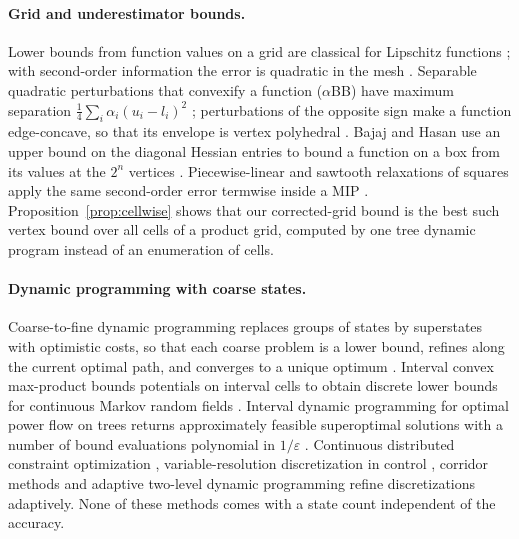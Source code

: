 \paragraph{Grid and underestimator bounds.}
Lower bounds from function values on a grid are classical for Lipschitz
functions \cite{Piyavskii1972,Shubert1972,Nesterov2004}; with second-order
information the error is quadratic in the mesh
\cite{DeKlerkLasserreLaurentSun2017}. Separable quadratic perturbations that
convexify a function ($\alpha$BB) have maximum separation
$\frac14\sum_i\alpha_i(u_i-l_i)^2$
\cite{MaranasFloudas1994,AndroulakisMaranasFloudas1995,AdjimanEtAl1998};
perturbations of the opposite sign make a function edge-concave, so that its
envelope is vertex polyhedral
\cite{Tardella2004,MeyerFloudas2005,Hasan2018,MisenerFloudas2012}. Bajaj and
Hasan use an upper bound on the diagonal Hessian entries to bound a function on
a box from its values at the $2^n$ vertices \cite{BajajHasan2020}.
Piecewise-linear and sawtooth relaxations of squares apply the same
second-order error termwise inside a MIP
\cite{BeachHildebrandHuchette2022,BeachEtAl2024,DongLuo2018}.
Proposition~\ref{prop:cellwise} shows that our corrected-grid bound is the best
such vertex bound over all cells of a product grid, computed by one tree
dynamic program instead of an enumeration of cells.

\paragraph{Dynamic programming with coarse states.}
Coarse-to-fine dynamic programming replaces groups of states by superstates
with optimistic costs, so that each coarse problem is a lower bound, refines
along the current optimal path, and converges to a unique optimum
\cite{Raphael2001,FelzenszwalbMcAllester2007}. Interval convex max-product
bounds potentials on interval cells to obtain discrete lower bounds for
continuous Markov random fields \cite{PengEtAl2011}. Interval dynamic
programming for optimal power flow on trees returns approximately feasible
superoptimal solutions with a number of bound evaluations polynomial in
$1/\varepsilon$ \cite[Theorem~2]{DvijothamEtAl2017}. Continuous distributed
constraint optimization \cite{HoangEtAl2020,TroullinosEtAl2022},
variable-resolution discretization in control \cite{MunosMoore2002}, corridor
methods \cite{HeidariEtAl1971} and adaptive two-level dynamic programming
\cite{LeaverFayKuhlmanSnoeyink2005} refine discretizations adaptively. None of
these methods comes with a state count independent of the accuracy.

